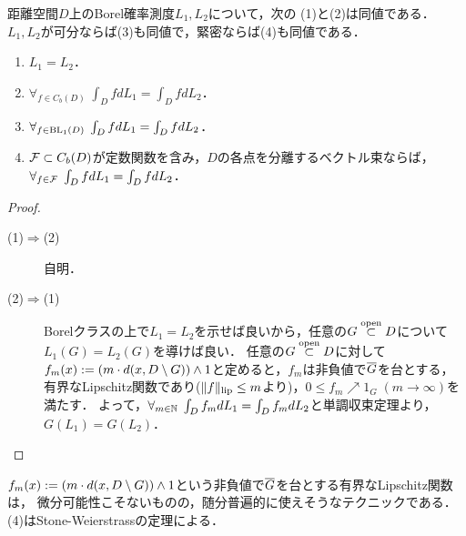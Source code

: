 \documentclass[uplatex,dvipdfmx]{jsreport}
\begin{document}
\begin{lemma}[弱収束の概念の安定性]\label{lemma-well-definedness-of-weak-convergence}
    距離空間$D$上のBorel確率測度$L_1,L_2$について，次の
    (1)と(2)は同値である．$L_1,L_2$が可分ならば(3)も同値で，緊密ならば(4)も同値である．
    \begin{enumerate}
        \item $L_1=L_2$．
        \item $\forall_{f\in C_b(D)}\;\int_DfdL_1=\int_DfdL_2$．
        \item $\forall_{f\in\mathrm{BL}_1(D)}\;\int_DfdL_1=\int_DfdL_2$．
        \item $\mathcal{F}\subset C_b(D)$が定数関数を含み，$D$の各点を分離するベクトル束ならば，$\forall_{f\in\mathcal{F}}\;\int_DfdL_1=\int_DfdL_2$．
    \end{enumerate}
\end{lemma}
\begin{proof}\mbox{}
    \begin{description}
        \item[(1)$\Rightarrow$(2)] 自明．
        \item[(2)$\Rightarrow$(1)] 
        Borelクラスの上で$L_1=L_2$を示せば良いから，任意の$G\overset{\mathrm{open}}{\subset} D$について$L_1(G)=L_2(G)$を導けば良い．
        任意の$G\overset{\mathrm{open}}{\subset} D$に対して$f_m(x):=\left(m\cdot d(x,D\setminus G)\right)\land 1$と定めると，$f_m$は非負値で$\overline{G}$を台とする，有界なLipschitz関数であり($\|f\|_{\textrm{lip}}\le m$より)，$0\le f_m\nearrow 1_G\;(m\to\infty)$を満たす．
        よって，$\forall_{m\in\mathbb{N}}\;\int_Df_mdL_1=\int_Df_mdL_2$と単調収束定理より，$G(L_1)=G(L_2)$．
    \end{description}
\end{proof}
\begin{remarks}
    $f_m(x):=\left(m\cdot d(x,D\setminus G)\right)\land 1$という非負値で$\overline{G}$を台とする有界なLipschitz関数は，
    微分可能性こそないものの，随分普遍的に使えそうなテクニックである．(4)はStone-Weierstrassの定理による．
\end{remarks}
\end{document}
